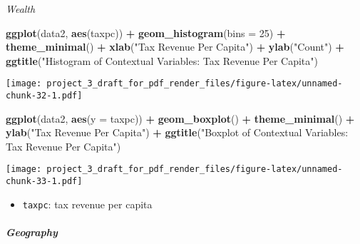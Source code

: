 \documentclass[]{article}
\newenvironment{Shaded}{\begin{snugshade}}{\end{snugshade}}
\newcommand{\CommentTok}[1]{\textcolor[rgb]{0.56,0.35,0.01}{\textit{#1}}}
\newcommand{\DataTypeTok}[1]{\textcolor[rgb]{0.13,0.29,0.53}{#1}}
\newcommand{\DecValTok}[1]{\textcolor[rgb]{0.00,0.00,0.81}{#1}}
\newcommand{\KeywordTok}[1]{\textcolor[rgb]{0.13,0.29,0.53}{\textbf{#1}}}
\newcommand{\NormalTok}[1]{#1}
\newcommand{\OperatorTok}[1]{\textcolor[rgb]{0.81,0.36,0.00}{\textbf{#1}}}
\newcommand{\StringTok}[1]{\textcolor[rgb]{0.31,0.60,0.02}{#1}}
\providecommand{\tightlist}{%
  \setlength{\itemsep}{0pt}\setlength{\parskip}{0pt}}
\let\oldsubparagraph\subparagraph
\renewcommand{\subparagraph}[1]{\oldsubparagraph{#1}\mbox{}}
\begin{document}
\emph{Wealth}

\begin{Shaded}
\begin{Highlighting}[]
\KeywordTok{ggplot}\NormalTok{(data2, }\KeywordTok{aes}\NormalTok{(taxpc)) }\OperatorTok{+}
\StringTok{  }\KeywordTok{geom_histogram}\NormalTok{(}\DataTypeTok{bins =} \DecValTok{25}\NormalTok{) }\OperatorTok{+}
\StringTok{  }\KeywordTok{theme_minimal}\NormalTok{() }\OperatorTok{+}
\StringTok{  }\KeywordTok{xlab}\NormalTok{(}\StringTok{"Tax Revenue Per Capita"}\NormalTok{) }\OperatorTok{+}
\StringTok{  }\KeywordTok{ylab}\NormalTok{(}\StringTok{"Count"}\NormalTok{) }\OperatorTok{+}
\StringTok{  }\KeywordTok{ggtitle}\NormalTok{(}\StringTok{"Histogram of Contextual Variables: Tax Revenue Per Capita"}\NormalTok{)}
\end{Highlighting}
\end{Shaded}

\texttt{[image: project\_3\_draft\_for\_pdf\_render\_files/figure-latex/unnamed-chunk-32-1.pdf]}

\begin{Shaded}
\begin{Highlighting}[]
\KeywordTok{ggplot}\NormalTok{(data2, }\KeywordTok{aes}\NormalTok{(}\DataTypeTok{y =}\NormalTok{ taxpc)) }\OperatorTok{+}
\StringTok{  }\KeywordTok{geom_boxplot}\NormalTok{() }\OperatorTok{+}
\StringTok{  }\KeywordTok{theme_minimal}\NormalTok{() }\OperatorTok{+}
\StringTok{  }\KeywordTok{ylab}\NormalTok{(}\StringTok{"Tax Revenue Per Capita"}\NormalTok{) }\OperatorTok{+}
\StringTok{  }\KeywordTok{ggtitle}\NormalTok{(}\StringTok{"Boxplot of Contextual Variables: Tax Revenue Per Capita"}\NormalTok{)}
\end{Highlighting}
\end{Shaded}

\texttt{[image: project\_3\_draft\_for\_pdf\_render\_files/figure-latex/unnamed-chunk-33-1.pdf]}

\begin{itemize}
\tightlist
\item
  \texttt{taxpc}: tax revenue per capita
\end{itemize}

\hypertarget{geography-1}{%
\subparagraph{Geography}\label{geography-1}}

\begin{Shaded}
\end{Shaded}
\end{document}
